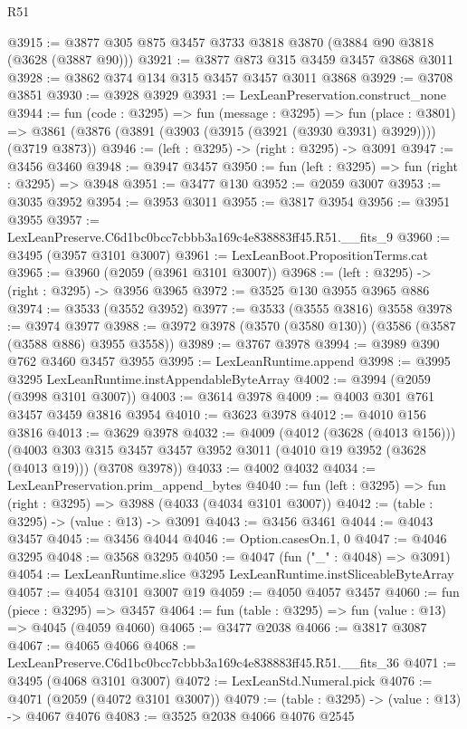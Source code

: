 \begin{lexlean}{R51}
\begin{coremodule}
@3915 := @3877 @305 @875 @3457 @3733 @3818 @3870 (@3884 @90 @3818 (@3628 (@3887 @90)))
@3921 := @3877 @873 @315 @3459 @3457 @3868 @3011
@3928 := @3862 @374 @134 @315 @3457 @3457 @3011 @3868
@3929 := @3708 @3851
@3930 := @3928 @3929
@3931 := LexLeanPreservation.construct_none
@3944 := fun (code : @3295) =>
  fun (message : @3295) =>
  fun (place : @3801) =>
  @3861 (@3876 (@3891 (@3903 (@3915 (@3921 (@3930 @3931) @3929)))) (@3719 @3873))
@3946 := (left : @3295) -> (right : @3295) -> @3091
@3947 := @3456 @3460
@3948 := @3947 @3457
@3950 := fun (left : @3295) => fun (right : @3295) => @3948
@3951 := @3477 @130
@3952 := @2059 @3007
@3953 := @3035 @3952
@3954 := @3953 @3011
@3955 := @3817 @3954
@3956 := @3951 @3955
@3957 := LexLeanPreserve.C6d1bc0bcc7cbbb3a169c4e838883ff45.R51.__fits_9
@3960 := @3495 (@3957 @3101 @3007)
@3961 := LexLeanBoot.PropositionTerms.cat
@3965 := @3960 (@2059 (@3961 @3101 @3007))
@3968 := (left : @3295) -> (right : @3295) -> @3956 @3965
@3972 := @3525 @130 @3955 @3965 @886
@3974 := @3533 (@3552 @3952)
@3977 := @3533 (@3555 @3816) @3558
@3978 := @3974 @3977
@3988 := @3972 @3978 (@3570 (@3580 @130)) (@3586 (@3587 (@3588 @886) @3955 @3558))
@3989 := @3767 @3978
@3994 := @3989 @390 @762 @3460 @3457 @3955
@3995 := LexLeanRuntime.append
@3998 := @3995 @3295 LexLeanRuntime.instAppendableByteArray
@4002 := @3994 (@2059 (@3998 @3101 @3007))
@4003 := @3614 @3978
@4009 := @4003 @301 @761 @3457 @3459 @3816 @3954
@4010 := @3623 @3978
@4012 := @4010 @156 @3816
@4013 := @3629 @3978
@4032 := @4009
    (@4012 (@3628 (@4013 @156)))
    (@4003 @303 @315 @3457 @3457 @3952 @3011 (@4010 @19 @3952 (@3628 (@4013 @19))) (@3708 @3978))
@4033 := @4002 @4032
@4034 := LexLeanPreservation.prim_append_bytes
@4040 := fun (left : @3295) => fun (right : @3295) => @3988 (@4033 (@4034 @3101 @3007))
@4042 := (table : @3295) -> (value : @13) -> @3091
@4043 := @3456 @3461
@4044 := @4043 @3457
@4045 := @3456 @4044
@4046 := Option.casesOn.{1, 0}
@4047 := @4046 @3295
@4048 := @3568 @3295
@4050 := @4047 (fun ("_" : @4048) => @3091)
@4054 := LexLeanRuntime.slice @3295 LexLeanRuntime.instSliceableByteArray
@4057 := @4054 @3101 @3007 @19
@4059 := @4050 @4057 @3457
@4060 := fun (piece : @3295) => @3457
@4064 := fun (table : @3295) => fun (value : @13) => @4045 (@4059 @4060)
@4065 := @3477 @2038
@4066 := @3817 @3087
@4067 := @4065 @4066
@4068 := LexLeanPreserve.C6d1bc0bcc7cbbb3a169c4e838883ff45.R51.__fits_36
@4071 := @3495 (@4068 @3101 @3007)
@4072 := LexLeanStd.Numeral.pick
@4076 := @4071 (@2059 (@4072 @3101 @3007))
@4079 := (table : @3295) -> (value : @13) -> @4067 @4076
@4083 := @3525 @2038 @4066 @4076 @2545

\end{coremodule}
\end{lexlean}
